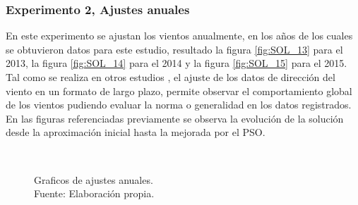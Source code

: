 \subsubsection{Experimento 2, Ajustes anuales}
En este experimento se ajustan los vientos anualmente, en los años de los cuales se obtuvieron datos para este estudio, resultado la figura \ref{fig:SOL_13} para el 2013, la figura \ref{fig:SOL_14} para el 2014 y la figura \ref{fig:SOL_15} para el 2015.
Tal como se realiza en otros estudios \cite{Heckenbergerova15} \cite{Winddirelse15}, el ajuste de los datos de dirección del viento en un formato
de largo plazo, permite observar el comportamiento global de los vientos pudiendo evaluar la norma o generalidad en los datos registrados.
En las figuras referenciadas previamente se observa la evolución de la solución desde la aproximación inicial hasta la mejorada por el PSO.

\begin{figure}[ht!]
     \centering
        \\
    \caption{Graficos de ajustes anuales.\\ Fuente: Elaboración propia.}
    \label{fig:subfigures}
\end{figure}


